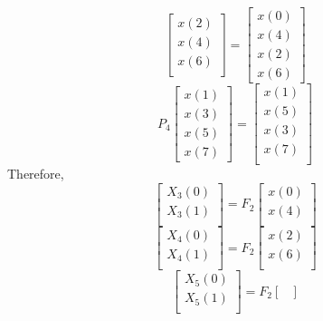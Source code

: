 \documentclass[journal,12pt,twocolumn]{IEEEtran}
\renewcommand\thesection{\arabic{section}}
\begin{document}
\begin{enumerate}[label=\thesection.\arabic*]
\begin{equation}
\begin{bmatrix}
x(2) \\ 
x(4) \\ 
x(6) \\
\end{bmatrix}
 = 
\begin{bmatrix}
x(0) \\ 
x(4) \\ 
x(2) \\
x(6)
\end{bmatrix}
\end{equation}
\begin{equation}
P_{4}
\begin{bmatrix}
x(1) \\ 
x(3) \\ 
x(5) \\
x(7)
\end{bmatrix}
 = 
\begin{bmatrix}
x(1) \\ 
x(5) \\ 
x(3) \\ 
x(7) \\
\end{bmatrix}
\end{equation}
Therefore,
\begin{equation}
\begin{bmatrix}
X_{3}(0) \\ 
X_{3}(1)\\ 
\end{bmatrix}
= F_{2}
\begin{bmatrix}
x(0) \\ 
x(4) \\ 
\end{bmatrix}
\end{equation}
\begin{equation}
\begin{bmatrix}
X_{4}(0) \\ 
X_{4}(1)\\ 
\end{bmatrix}
= F_{2}
\begin{bmatrix}
x(2) \\ 
x(6) \\ 
\end{bmatrix}
\end{equation}
\begin{equation}
\begin{bmatrix}
X_{5}(0) \\ 
X_{5}(1)\\ 
\end{bmatrix}
= F_{2}
\begin{bmatrix}

\end{bmatrix}
\end{equation}
\end{enumerate}
\end{document}
